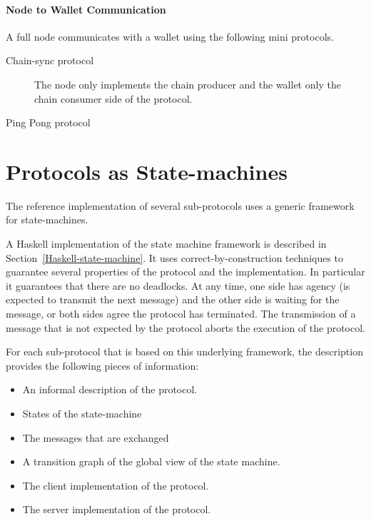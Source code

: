 \documentclass{report}
\theoremstyle{definition}{
  \newtheorem{lemma}{Lemma}[section] %
  \newtheorem{definition}[lemma]{Definition}
}
\theoremstyle{theorem}{
  \newtheorem{invariant}[lemma]{Invariant}
  \newtheorem{proofobligation}[lemma]{Proof Obligation}
}
\numberwithin{equation}{lemma}
\begin{document}
\paragraph{Node to Wallet Communication}
A full node communicates with a wallet using the following mini protocols.
\begin{description}
\item[Chain-sync protocol] The node only implements the chain producer and the wallet only the chain consumer side of the protocol.
\item[Ping Pong protocol]
\end{description}

\section{Protocols as State-machines}
The reference implementation of several sub-protocols uses a generic framework
for state-machines.

A Haskell implementation of the state machine framework is described in
Section~\ref{Haskell-state-machine}. It uses correct-by-construction
techniques to guarantee
several properties of the protocol and the implementation.
In particular it guarantees that there are no deadlocks. At any time, one side has agency
(is expected to transmit the next message) and the other side is waiting for the message,
or both sides agree the protocol has terminated.
The transmission of a message that is not expected by the protocol aborts the execution
of the protocol.

For each sub-protocol that is based on this underlying framework, the description provides the
following pieces of information:

\begin{itemize}
\item An informal description of the protocol.
\item States of the state-machine
\item The messages that are exchanged
\item A transition graph of the global view of the state machine.
\item The client implementation of the protocol.
\item The server implementation of the protocol.
\end{itemize}
\end{document}
